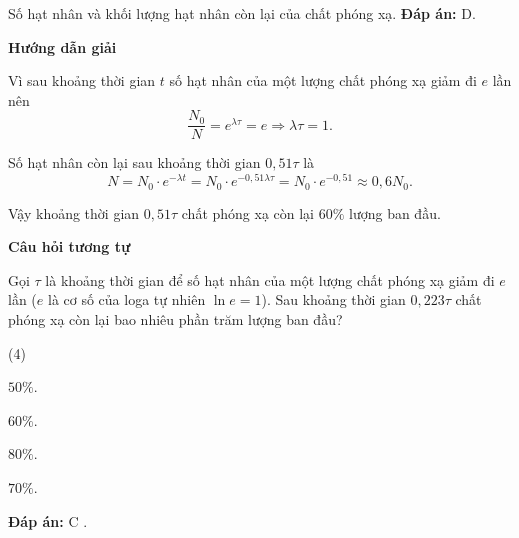 \begin{dang}{Số hạt nhân và khối lượng hạt nhân còn lại của chất phóng xạ.}
{	\textbf{Đáp án:} D.}
	
	{
	\begin{center}
		\textbf{Hướng dẫn giải}
	\end{center}
	
	Vì sau khoảng thời gian $t$ số hạt nhân của một lượng chất phóng xạ giảm đi $e$ lần nên
	\begin{equation*}
	\dfrac{N_0}{N}=e^{\lambda \tau }=e\Rightarrow \lambda \tau  = 1.
	\end{equation*}
	
	Số hạt nhân còn lại sau khoảng thời gian $0,51 \tau$ là
	\begin{equation*}
	N=N_0\cdot e^{-\lambda t}=N_0\cdot e^{-0,51\lambda \tau}=N_0\cdot e^{-0,51}\approx0,6N_0.
	\end{equation*}
	
	Vậy khoảng thời gian $0,51 \tau$ chất phóng xạ còn lại $60\%$ lượng ban đầu.
	
	\begin{center}
		\textbf{Câu hỏi tương tự}
	\end{center}
	
Gọi $\tau $ là khoảng thời gian để số hạt nhân của một lượng chất phóng xạ giảm đi $e$ lần ($e$ là cơ số của loga tự nhiên $\ln e=1$). Sau khoảng thời gian $0,223 \tau $ chất phóng xạ còn lại bao nhiêu phần trăm lượng ban đầu?
	\begin{mcq}(4)
		\item $50\%$.
		\item $60\%$.
		\item $80\%$.
		\item $70\%$.
	\end{mcq}
	
	\textbf{Đáp án:} C	.
}

\end{dang}

